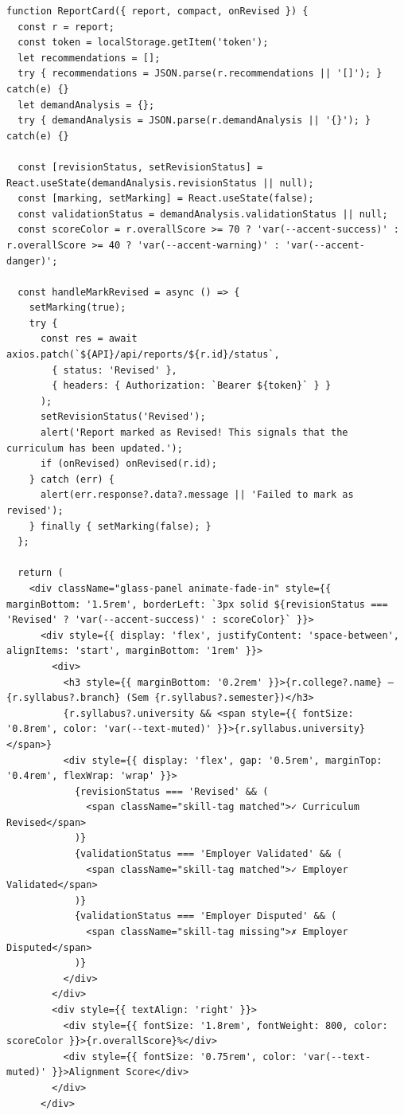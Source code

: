 \documentclass[12pt,a4paper]{report}
\begin{document}
\begin{verbatim}
function ReportCard({ report, compact, onRevised }) {
  const r = report;
  const token = localStorage.getItem('token');
  let recommendations = [];
  try { recommendations = JSON.parse(r.recommendations || '[]'); } catch(e) {}
  let demandAnalysis = {};
  try { demandAnalysis = JSON.parse(r.demandAnalysis || '{}'); } catch(e) {}

  const [revisionStatus, setRevisionStatus] = React.useState(demandAnalysis.revisionStatus || null);
  const [marking, setMarking] = React.useState(false);
  const validationStatus = demandAnalysis.validationStatus || null;
  const scoreColor = r.overallScore >= 70 ? 'var(--accent-success)' : r.overallScore >= 40 ? 'var(--accent-warning)' : 'var(--accent-danger)';

  const handleMarkRevised = async () => {
    setMarking(true);
    try {
      const res = await axios.patch(`${API}/api/reports/${r.id}/status`,
        { status: 'Revised' },
        { headers: { Authorization: `Bearer ${token}` } }
      );
      setRevisionStatus('Revised');
      alert('Report marked as Revised! This signals that the curriculum has been updated.');
      if (onRevised) onRevised(r.id);
    } catch (err) {
      alert(err.response?.data?.message || 'Failed to mark as revised');
    } finally { setMarking(false); }
  };

  return (
    <div className="glass-panel animate-fade-in" style={{ marginBottom: '1.5rem', borderLeft: `3px solid ${revisionStatus === 'Revised' ? 'var(--accent-success)' : scoreColor}` }}>
      <div style={{ display: 'flex', justifyContent: 'space-between', alignItems: 'start', marginBottom: '1rem' }}>
        <div>
          <h3 style={{ marginBottom: '0.2rem' }}>{r.college?.name} — {r.syllabus?.branch} (Sem {r.syllabus?.semester})</h3>
          {r.syllabus?.university && <span style={{ fontSize: '0.8rem', color: 'var(--text-muted)' }}>{r.syllabus.university}</span>}
          <div style={{ display: 'flex', gap: '0.5rem', marginTop: '0.4rem', flexWrap: 'wrap' }}>
            {revisionStatus === 'Revised' && (
              <span className="skill-tag matched">✓ Curriculum Revised</span>
            )}
            {validationStatus === 'Employer Validated' && (
              <span className="skill-tag matched">✓ Employer Validated</span>
            )}
            {validationStatus === 'Employer Disputed' && (
              <span className="skill-tag missing">✗ Employer Disputed</span>
            )}
          </div>
        </div>
        <div style={{ textAlign: 'right' }}>
          <div style={{ fontSize: '1.8rem', fontWeight: 800, color: scoreColor }}>{r.overallScore}%</div>
          <div style={{ fontSize: '0.75rem', color: 'var(--text-muted)' }}>Alignment Score</div>
        </div>
      </div>


\end{verbatim}
\end{document}
